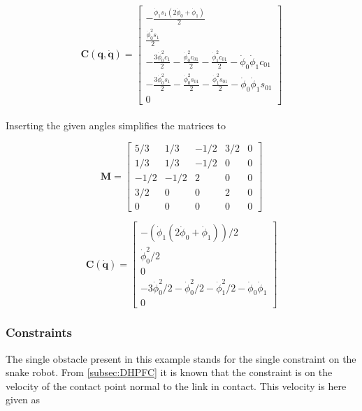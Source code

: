 \begin{equation}\label{eq:ex_coriolis}
    \mathbf{C(q, \dot{q})} = 
    \begin{bmatrix}
        -\frac{\dot{\phi}_1 s_1 (2\dot{\phi}_0+ \dot{\phi}_1)}{2} \\
        \frac{\dot{\phi}_0^2 s_1}{2} \\
        -\frac{3 \dot{\phi}_0^2 c_1}{2} - \frac{\dot{\phi}_0^2 c_{01}}{2} - \frac{\dot{\phi}_1^2 c_{01}}{2} - \dot{\phi}_0 \dot{\phi}_1 c_{01} \\
        -\frac{3 \dot{\phi}_0^2 s_1}{2} - \frac{\dot{\phi}_0^2 s_{01}}{2} - \frac{\dot{\phi}_1^2 s_{01}}{2} - \dot{\phi}_0 \dot{\phi}_1 s_{01} \\
        0
    \end{bmatrix}
\end{equation}
\\
Inserting the given angles simplifies the matrices to

\begin{equation}
    \mathbf{M} = 
    \begin{bmatrix}
        5/3 & 1/3 & -1/2 & 3/2 & 0 \\
        1/3 & 1/3 & -1/2 & 0 & 0 \\
        -1/2 & -1/2 & 2 & 0 & 0 \\
        3/2 & 0 & 0 & 2 & 0 \\
        0 & 0 & 0 & 0 & 0 
    \end{bmatrix}
\end{equation}

\begin{equation}
    \mathbf{C(\dot{q})} = 
    \begin{bmatrix}
        -(\dot{\phi}_1 (2\dot{\phi}_0+ \dot{\phi}_1))/2 \\
        \dot{\phi}_0^2/2 \\
        0 \\
        -3 \dot{\phi}_0^2/2 - \dot{\phi}_0^2/2 - \dot{\phi}_1^2/2 - \dot{\phi}_0 \dot{\phi}_1 \\
        0
    \end{bmatrix}
\end{equation}

\subsubsection{Constraints}

The single obstacle present in this example stands for the single constraint on the snake robot. 
From \ref{subsec:DHPFC} it is known that the constraint is on the velocity of the contact point normal to the link in contact. This velocity is here given as

